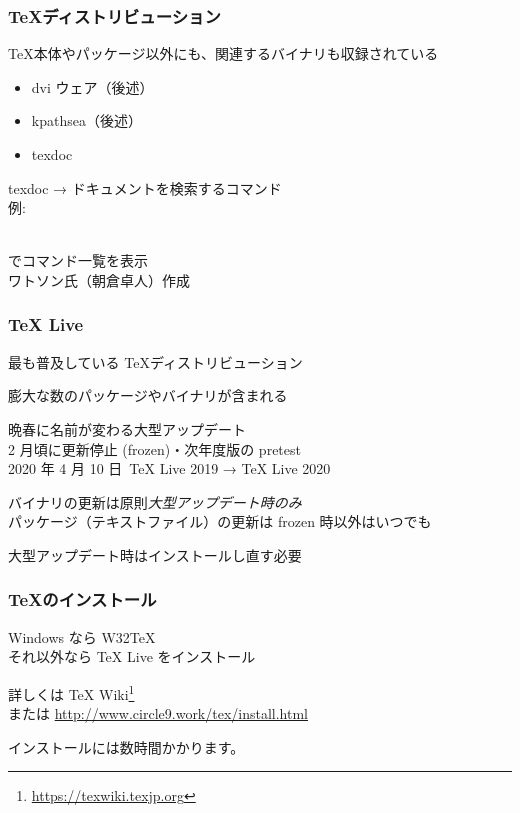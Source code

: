 \begin{frame}
	\frametitle{\TeX ディストリビューション}
	\TeX 本体やパッケージ以外にも、関連するバイナリも収録されている
	
	\begin{itemize}
		\item dvi ウェア（後述）
		\item kpathsea（後述）
		\item texdoc
	\end{itemize}
	
	texdoc → ドキュメントを検索するコマンド\\
	{\footnotesize 例: }
	
	\\でコマンド一覧を表示\\
	{\footnotesize ワトソン氏（朝倉卓人）作成}
\end{frame}

\begin{frame}
	\frametitle{{\TeX} Live}
	最も普及している \TeX ディストリビューション
	
	膨大な数のパッケージやバイナリが含まれる
	
	晩春に名前が変わる大型アップデート\\
	{\footnotesize 2 月頃に更新停止 (frozen)・次年度版の pretest\\
	2020 年 4 月 10 日~{\TeX} Live 2019 → {\TeX} Live 2020}
	
	バイナリの更新は原則\emph{大型アップデート時のみ}\\
	{\footnotesize パッケージ（テキストファイル）の更新は frozen 時以外はいつでも}
	
	大型アップデート時はインストールし直す必要
\end{frame}


\begin{frame}
	\frametitle{\TeX のインストール}
	Windows なら W32TeX\\
	それ以外なら {\TeX} Live をインストール
	
	詳しくは {\TeX} Wiki\footnote{\url{https://texwiki.texjp.org}}\\
	または \url{http://www.circle9.work/tex/install.html}
	
	インストールには数時間かかります。
\end{frame}

